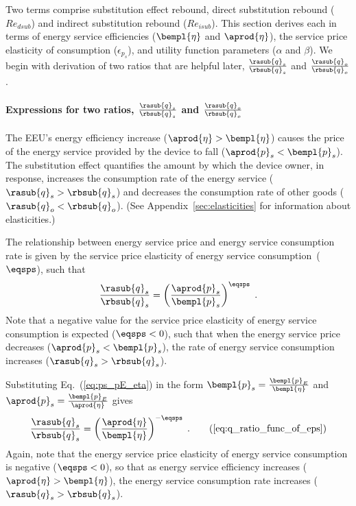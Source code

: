 \subsubsection{\Subeffect{}} 
\label{sec:Re_sub}

Two terms comprise substitution effect rebound,
direct substitution rebound ($Re_{dsub}$) and
indirect substitution rebound ($Re_{isub}$).
This section derives each in terms of energy service efficiencies ($\bempl{\eta}$ and $\aprod{\eta}$),
the service price elasticity of consumption ($\epsilon_{p_s}$), and
utility function parameters ($\alpha$ and $\beta$).
We begin with derivation of two ratios that are helpful later,
$\frac{\rasub{q}_s}{\rbsub{q}_s}$ and
$\frac{\rasub{q}_o}{\rbsub{q}_o}$.


\paragraph{Expressions for two ratios, $\frac{\rasub{q}_s}{\rbsub{q}_s}$ and $\frac{\rasub{q}_o}{\rbsub{q}_o}$}
\label{sec:two_ratios}

The EEU's energy efficiency increase
($\aprod{\eta} > \bempl{\eta}$)
causes the price of the energy service provided by the device to fall
($\aprod{p}_s < \bempl{p}_s$).
The substitution effect quantifies the amount by which
the device owner, in response,
increases the consumption rate of the energy service ($\rasub{q}_s > \rbsub{q}_s$) and
decreases the consumption rate of other goods ($\rasub{q}_o < \rbsub{q}_o$).
(See Appendix~\ref{sec:elasticities} for information about elasticities.)

The relationship between energy service price and energy service consumption rate
is given by the service price elasticity of energy service consumption~($\eqsps$),
such that
%
\begin{equation}
  \frac{\rasub{q}_s}{\rbsub{q}_s} = \left( \frac{\aprod{p}_s}{\bempl{p}_s} \right)^{\eqsps} \; .
\end{equation}
%
Note that a negative value for the service price elasticity of energy service consumption
is expected ($\eqsps < 0$),
such that when the energy service price decreases ($\aprod{p}_s < \bempl{p}_s$),
the rate of energy service consumption increases ($\rasub{q}_s > \rbsub{q}_s$).

Substituting Eq.~(\ref{eq:ps_pE_eta}) in the form
$\bempl{p}_s = \frac{\bempl{p}_E}{\bempl{\eta}}$ and
$\aprod{p}_s = \frac{\bempl{p}_E}{\aprod{\eta}}$
gives
%
\begin{equation}
  \frac{\rasub{q}_s}{\rbsub{q}_s} = \left( \frac{\aprod{\eta}}{\bempl{\eta}} \right)^{-\eqsps} \; .
                                                                        \tag{\ref{eq:q_ratio_func_of_eps}}
\end{equation}
%
Again, note that the energy service price elasticity of energy service consumption
is negative ($\eqsps < 0$), so that
as energy service efficiency increases ($\aprod{\eta} > \bempl{\eta}$),
the energy service consumption rate increases ($\rasub{q}_s > \rbsub{q}_s$).

